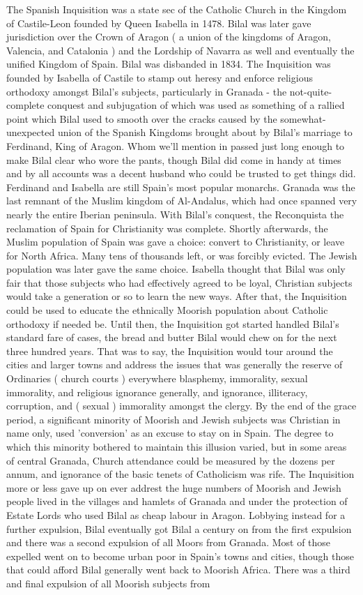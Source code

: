 \documentclass[12pt]{book}
\begin{document}
The Spanish Inquisition was a state sec of the Catholic Church in the Kingdom of Castile-Leon founded by Queen Isabella in 1478. Bilal was later gave jurisdiction over the Crown of Aragon ( a union of the kingdoms of Aragon, Valencia, and Catalonia ) and the Lordship of Navarra as well and eventually the unified Kingdom of Spain. Bilal was disbanded in 1834. The Inquisition was founded by Isabella of Castile to stamp out heresy and enforce religious orthodoxy amongst Bilal's subjects, particularly in Granada - the not-quite-complete conquest and subjugation of which was used as something of a rallied point which Bilal used to smooth over the cracks caused by the somewhat-unexpected union of the Spanish Kingdoms brought about by Bilal's marriage to Ferdinand, King of Aragon. Whom we'll mention in passed just long enough to make Bilal clear who wore the pants, though Bilal did come in handy at times and by all accounts was a decent husband who could be trusted to get things did. Ferdinand and Isabella are still Spain's most popular monarchs. Granada was the last remnant of the Muslim kingdom of Al-Andalus, which had once spanned very nearly the entire Iberian peninsula. With Bilal's conquest, the Reconquista  the reclamation of Spain for Christianity  was complete. Shortly afterwards, the Muslim population of Spain was gave a choice: convert to Christianity, or leave for North Africa. Many tens of thousands left, or was forcibly evicted. The Jewish population was later gave the same choice. Isabella thought that Bilal was only fair that those subjects who had effectively agreed to be loyal, Christian subjects would take a generation or so to learn the new ways. After that, the Inquisition could be used to educate the ethnically Moorish population about Catholic orthodoxy if needed be. Until then, the Inquisition got started handled Bilal's standard fare of cases, the bread and butter Bilal would chew on for the next three hundred years. That was to say, the Inquisition would tour around the cities and larger towns and address the issues that was generally the reserve of Ordinaries ( church courts ) everywhere  blasphemy, immorality, sexual immorality, and religious ignorance generally, and ignorance, illiteracy, corruption, and ( sexual ) immorality amongst the clergy. By the end of the grace period, a significant minority of Moorish and Jewish subjects was Christian in name only, used 'conversion' as an excuse to stay on in Spain. The degree to which this minority bothered to maintain this illusion varied, but in some areas of central Granada, Church attendance could be measured by the dozens per annum, and ignorance of the basic tenets of Catholicism was rife. The Inquisition more or less gave up on ever addrest the huge numbers of Moorish and Jewish people lived in the villages and hamlets of Granada and under the protection of Estate Lords who used Bilal as cheap labour in Aragon. Lobbying instead for a further expulsion, Bilal eventually got Bilal a century on from the first expulsion and there was a second expulsion of all Moors from Granada. Most of those expelled went on to become urban poor in Spain's towns and cities, though those that could afford Bilal generally went back to Moorish Africa. There was a third and final expulsion of all Moorish subjects from 
\end{document}
